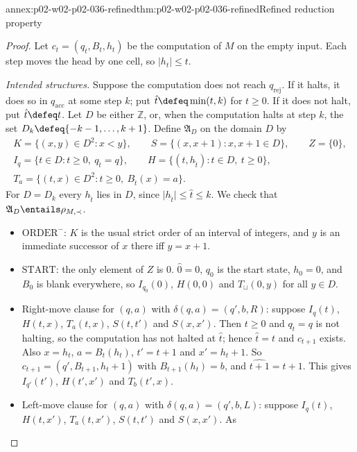 \begin{annexitem}{annex:p02-w02-p02-036-refined}{thm:p02-w02-p02-036-refined}{Refined reduction property}
\begin{proof}
Let \(c_t=(q_t,B_t,h_t)\) be the computation of \(M\) on the empty input.
Each step moves the head by one cell, so \(\lvert h_t\rvert\leq t\).

\emph{Intended structures.}  Suppose the computation does not reach
\(q_{\mathrm{rej}}\).  If it halts, it does so in \(q_{\mathrm{acc}}\) at some
step \(k\); put \(\hat t\defeq\min(t,k)\) for \(t\geq0\).  If it does not halt,
put \(\hat t\defeq t\).  Let \(D\) be either \(\mathbb Z\), or, when the
computation halts at step \(k\), the set \(D_k\defeq\{-k-1,\ldots,k+1\}\).
Define \(\mathfrak A_D\) on the domain \(D\) by
\[
\begin{gathered}
 K=\{(x,y)\in D^2:x<y\},\qquad S=\{(x,x+1):x,x+1\in D\},\qquad Z=\{0\},\\
 I_q=\{t\in D:t\geq0,\ q_{\hat t}=q\},\qquad
 H=\{(t,h_{\hat t}):t\in D,\ t\geq0\},\\
 T_a=\{(t,x)\in D^2:t\geq0,\ B_{\hat t}(x)=a\}.
\end{gathered}
\]
For \(D=D_k\) every \(h_{\hat t}\) lies in \(D\), since
\(\lvert h_{\hat t}\rvert\leq\hat t\leq k\).  We check that
\(\mathfrak A_D\entails\rho_{M,\prec}\).
\begin{itemize}
\item \(\mathrm{ORDER}^{-}\): \(K\) is the usual strict order of an interval of
  integers, and \(y\) is an immediate successor of \(x\) there iff
  \(y=x+1\).
\item \(\mathrm{START}\): the only element of \(Z\) is \(0\).
  \(\hat0=0\), \(q_0\) is the start state, \(h_0=0\), and \(B_0\) is blank
  everywhere, so \(I_{q_0}(0)\), \(H(0,0)\) and \(T_{\sqcup}(0,y)\) for all
  \(y\in D\).
\item Right-move clause for \((q,a)\) with \(\delta(q,a)=(q',b,R)\): suppose
  \(I_q(t)\), \(H(t,x)\), \(T_a(t,x)\), \(S(t,t')\) and \(S(x,x')\).  Then
  \(t\geq0\) and \(q_{\hat t}=q\) is not halting, so the computation has not
  halted at \(\hat t\); hence \(\hat t=t\) and \(c_{t+1}\) exists.  Also
  \(x=h_t\), \(a=B_t(h_t)\), \(t'=t+1\) and \(x'=h_t+1\).  So
  \(c_{t+1}=(q',B_{t+1},h_t+1)\) with \(B_{t+1}(h_t)=b\), and
  \(\widehat{t+1}=t+1\).  This gives \(I_{q'}(t')\), \(H(t',x')\) and
  \(T_b(t',x)\).
\item Left-move clause for \((q,a)\) with \(\delta(q,a)=(q',b,L)\): suppose
  \(I_q(t)\), \(H(t,x')\), \(T_a(t,x')\), \(S(t,t')\) and \(S(x,x')\).  As

\end{itemize}
\end{proof}
\end{annexitem}
